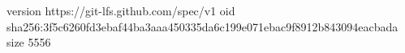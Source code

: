 version https://git-lfs.github.com/spec/v1
oid sha256:3f5c6260fd3ebaf44ba3aaa450335da6c199e071ebac9f8912b843094eacbada
size 5556
